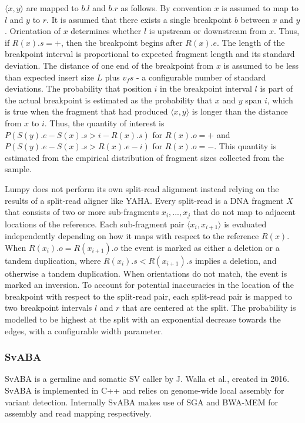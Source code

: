 $\langle x, y \rangle$ are mapped to $b.l$ and $b.r$ as follows. By convention $x$ is assumed to map to $l$ and $y$ to $r$. It is assumed that there exists a single breakpoint $b$ between $x$ and $y$. Orientation of $x$ determines whether $l$ is upstream or downstream from $x$. Thus, if $R(x).s = +$, then the breakpoint begins after $R(x).e$. The length of the breakpoint interval is proportional to expected fragment length and its standard deviation. The distance of one end of the breakpoint from $x$ is assumed to be less than expected insert size $L$ plus $v_fs$ - a configurable number of standard deviations. The probability that position $i$ in the breakpoint interval $l$ is part of the actual breakpoint is estimated as the probability that $x$ and $y$ span $i$, which is true when the fragment that had produced $\langle x, y \rangle$ is longer than the distance from $x$ to $i$. Thus, the quantity of interest is $P(S(y).e - S(x).s > i - R(x).s)$ for $R(x).o = +$ and $P(S(y).e - S(x).s > R(x).e -i)$ for $R(x).o = -$. This quantity is estimated from the empirical distribution of fragment sizes collected from the sample.

Lumpy does not perform its own split-read alignment instead relying on the results of a split-read aligner like YAHA\autocite{faust2012yaha}. Every split-read is a DNA fragment $X$ that consists of two or more sub-fragments $x_i,...,x_j$ that do not map to adjacent locations of the reference. Each sub-fragment pair $\langle x_i, x_{i+1} \rangle$ is evaluated independently depending on how it maps with respect to the reference $R(x)$. When $R(x_i).o = R(x_{i+1}).o$ the event is marked as either a deletion or a tandem duplication, where $R(x_i).s < R(x_{i+1}).s$ implies a deletion, and otherwise a tandem duplication. When orientations do not match, the event is marked an inversion. To account for potential inaccuracies in the location of the breakpoint with respect to the split-read pair, each split-read pair is mapped to two breakpoint intervals $l$ and $r$ that are centered at the split. The probability is modelled to be highest at the split with an exponential decrease towards the edges, with a configurable width parameter.

\subsubsection{SvABA}

SvABA\autocite{wala2018svaba} is a germline and somatic SV caller by J. Walla et al., created in 2016. SvABA is implemented in C++ and relies on genome-wide local assembly for variant detection. Internally SvABA makes use of SGA\autocite{simpson2012efficient} and BWA-MEM\autocite{li2009fast} for assembly and read mapping respectively. 

